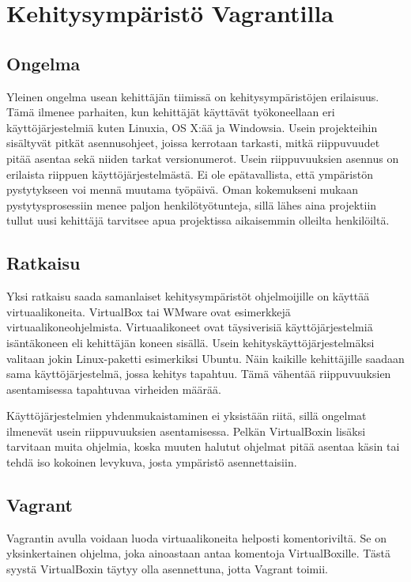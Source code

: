 \chapter{Kehitysympäristö Vagrantilla}

\section{Ongelma}
Yleinen ongelma usean kehittäjän tiimissä on kehitysympäristöjen erilaisuus. Tämä ilmenee parhaiten, kun kehittäjät käyttävät työkoneellaan eri käyttöjärjestelmiä kuten Linuxia, OS X:ää ja Windowsia. Usein projekteihin sisältyvät pitkät asennusohjeet, joissa kerrotaan tarkasti, mitkä riippuvuudet pitää asentaa sekä niiden tarkat versionumerot. Usein riippuvuuksien asennus on erilaista riippuen käyttöjärjestelmästä. Ei ole epätavallista, että ympäristön pystytykseen voi mennä muutama työpäivä. Oman kokemukseni mukaan pystytysprosessiin menee paljon henkilötyötunteja, sillä lähes aina projektiin tullut uusi kehittäjä tarvitsee apua projektissa aikaisemmin olleilta henkilöiltä.

\section{Ratkaisu}
Yksi ratkaisu saada samanlaiset kehitysympäristöt ohjelmoijille on käyttää virtuaalikoneita. VirtualBox tai WMware ovat esimerkkejä virtuaalikoneohjelmista. Virtuaalikoneet ovat täysiverisiä käyttöjärjestelmiä isäntäkoneen eli kehittäjän koneen sisällä. Usein kehityskäyttöjärjestelmäksi valitaan jokin Linux-paketti esimerkiksi Ubuntu. Näin kaikille kehittäjille saadaan sama käyttöjärjestelmä, jossa kehitys tapahtuu. Tämä vähentää riippuvuuksien asentamisessa tapahtuvaa virheiden määrää.

Käyttöjärjestelmien yhdenmukaistaminen ei yksistään riitä, sillä ongelmat ilmenevät usein riippuvuuksien asentamisessa. Pelkän VirtualBoxin lisäksi tarvitaan muita ohjelmia, koska muuten halutut ohjelmat pitää asentaa käsin tai tehdä iso kokoinen levykuva, josta ympäristö asennettaisiin.

\section{Vagrant}
Vagrantin avulla voidaan luoda virtuaalikoneita helposti komentoriviltä. Se on yksinkertainen ohjelma, joka ainoastaan antaa komentoja VirtualBoxille. Tästä syystä VirtualBoxin täytyy olla asennettuna, jotta Vagrant toimii.

